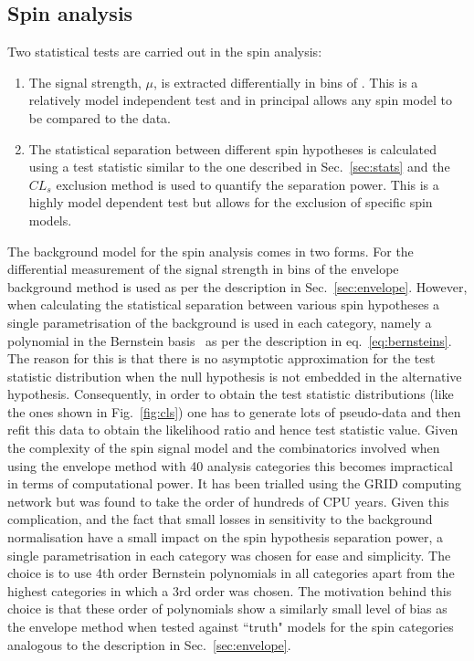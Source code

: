 \subsection{Spin analysis}

Two statistical tests are carried out in the spin analysis:

\begin{enumerate}
  \item The signal strength, $\mu$, is extracted differentially in bins of \abscostheta. This is a relatively model independent test and in principal allows any spin model to be compared to the data.
  \item The statistical separation between different spin hypotheses is calculated using a test statistic similar to the one described in Sec.~\ref{sec:stats} and the $CL_{s}$ exclusion method is used to quantify the separation power. This is a highly model dependent test but allows for the exclusion of specific spin models.
\end{enumerate}

The background model for the spin analysis comes in two forms. For the differential measurement of the signal strength in bins of \abscostheta the envelope background method is used as per the description in Sec.~\ref{sec:envelope}. However, when calculating the statistical separation between various spin hypotheses a single parametrisation of the background is used in each category, namely a polynomial in the Bernstein basis~\cite{bernsteins1,bernsteins2} as per the description in eq.~\ref{eq:bernsteins}. The reason for this is that there is no asymptotic approximation for the test statistic distribution when the null hypothesis is not embedded in the alternative hypothesis. Consequently, in order to obtain the test statistic distributions (like the ones shown in Fig.~\ref{fig:cls}) one has to generate lots of pseudo-data and then refit this data to obtain the likelihood ratio and hence test statistic value. Given the complexity of the spin signal model and the combinatorics involved when using the envelope method with 40 analysis categories this becomes impractical in terms of computational power. It has been trialled using the GRID computing network but was found to take the order of hundreds of CPU years.
Given this complication, and the fact that small losses in sensitivity to the background normalisation have a small impact on the spin hypothesis separation power, a single parametrisation in each category was chosen for ease and simplicity. The choice is to use 4th order Bernstein polynomials in all categories apart from the highest \abscostheta categories in which a 3rd order was chosen. The motivation behind this choice is that these order of polynomials show a similarly small level of bias as the envelope method when tested against ``truth" models for the spin categories analogous to the description in Sec.~\ref{sec:envelope}.


